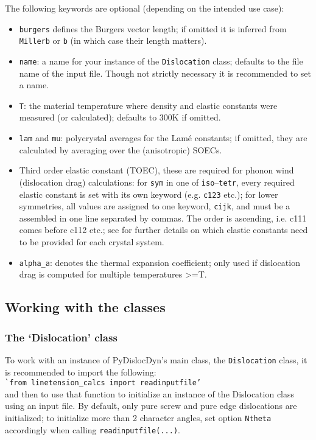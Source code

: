 \documentclass[11pt,letterpaper,oneside,pdftex]{article}
\begin{document}
\noindent
The following keywords are optional (depending on the intended use case):
\begin{itemize}
\item \verb|burgers| defines the Burgers vector length; if omitted it is inferred from \verb|Millerb| or \verb|b| (in which case their length matters).

\item \verb|name|: a name for your instance of the \verb|Dislocation| class; defaults to the file name of the input file.
Though not strictly necessary it is recommended to set a name.

\item \verb|T|: the material temperature where density and elastic constants were measured (or calculated); defaults to 300K if omitted.

\item \verb|lam| and \verb|mu|: polycrystal averages for the Lam\'e constants; if omitted, they are calculated by averaging over the (anisotropic) SOECs.

\item Third order elastic constant (TOEC), these are required for phonon wind (dislocation drag) calculations:
for \verb|sym| in one of \verb|iso|--\verb|tetr|, every required elastic constant is set with its own keyword (e.g. \verb|c123| etc.);
for lower symmetries, all values are assigned to one keyword, \verb|cijk|, and must be a assembled in one line separated by commas.
The order is ascending, i.e. c111 comes before c112 etc.; see \cite{Brugger:1965} for further details on which elastic constants need to be provided for each crystal system.

\item \verb|alpha_a|: denotes the thermal expansion coefficient; only used if dislocation drag is computed for multiple temperatures >=T.
\end{itemize}



\subsection{Working with the classes}
\label{sec:classes}
\subsubsection{The `Dislocation' class}
\label{sec:Dislocation}

To work with an instance of PyDislocDyn's main class, the \verb|Dislocation| class, it is recommended to import the following:
\\\verb|`from linetension_calcs import readinputfile’|\\
and then to use that function to initialize an instance of the Dislocation class using an input file.
By default, only pure screw and pure edge dislocations are initialized; to initialize more than 2 character angles, set option \verb|Ntheta| accordingly when calling \verb|readinputfile(...)|.
\end{document}
